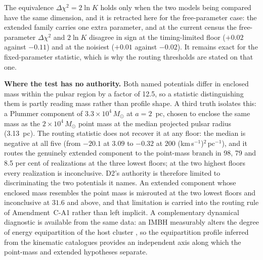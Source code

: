 \documentclass[11pt]{article}
\newcommand{\msun}{\ensuremath{M_\odot}}
\begin{document}
The equivalence $\Delta\chi^{2} = 2\ln K$ holds only when the two models being compared have the same dimension, and it is retracted here for the free-parameter case: the extended family carries one extra parameter, and at the current census the free-parameter $\Delta\chi^{2}$ and $2\ln K$ disagree in sign at the timing-limited floor ($+0.02$ against $-0.11$) and at the noisiest ($+0.01$ against $-0.02$). It remains exact for the fixed-parameter statistic, which is why the routing thresholds are stated on that one.

\textbf{Where the test has no authority.} Both named potentials differ in enclosed mass within the pulsar region by a factor of 12.5, so a statistic distinguishing them is partly reading mass rather than profile shape. A third truth isolates this: a Plummer component of $3.3\times10^{4}\,\msun$ at $a = 2$~pc, chosen to enclose the same mass as the $2\times10^{4}\,\msun$ point mass at the median projected pulsar radius (3.13~pc). The routing statistic does not recover it at any floor: the median is negative at all five (from $-20.1$ at $3.09$ to $-0.32$ at $200$ (km\,s$^{-1}$)$^{2}$\,pc$^{-1}$), and it routes the genuinely extended component to the point-mass branch in 98, 79 and 8.5 per cent of realizations at the three lowest floors; at the two highest floors every realization is inconclusive. D2's authority is therefore limited to discriminating the two potentials it names. An extended component whose enclosed mass resembles the point mass is misrouted at the two lowest floors and inconclusive at $31.6$ and above, and that limitation is carried into the routing rule of Amendment~C-A1 rather than left implicit. A complementary dynamical diagnostic is available from the same data: an IMBH measurably alters the degree of energy equipartition of the host cluster \citep{ArosVesperini2023}, so the equipartition profile inferred from the kinematic catalogues provides an independent axis along which the point-mass and extended hypotheses separate.
\end{document}
